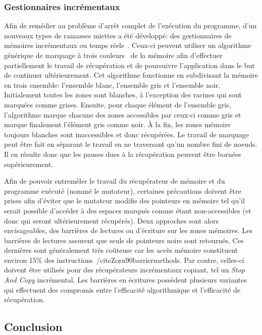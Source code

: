 \documentclass[12pt,oneside,letterpaper,francais]{book}
\begin{document}
\subsubsection{Gestionnaires incrémentaux}
Afin de remédier au problème d'arrêt complet de l'exécution du
programme, d'un nouveaux types de ramasses miettes a été développé:
des gestionnaires de mémoires incrémentaux ou temps
réels~\cite{INCR_BAKER}. Ceux-ci peuvent utiliser un algorithme
générique de marquage à trois couleurs~\cite{dijkstra-tricolour} de la
mémoire afin d'effectuer partiellement le travail de récupération et
de poursuivre l'application dans le but de continuer
ultérieurement. Cet algorithme fonctionne en subdivisant la mémoire en
trois ensemble: l'ensemble blanc, l'ensemble gris et l'ensemble
noir. Initialement toutes les zones sont blanches, à l'exception des
racines qui sont marquées comme grises. Ensuite, pour chaque élément
de l'ensemble gris, l'algorithme marque chacune des zones accessibles
par ceux-ci comme gris et marque finalement l'élément gris comme
noir. À la fin, les zones mémoire toujours blanches sont inaccessibles
et donc récupérées.  Le travail de marquage peut être fait en séparant
le travail en ne traversant qu'un nombre fini de noeuds. Il en résulte
donc que les pauses dues à la récupération peuvent être bornées
supérieurement.

Afin de pouvoir entremêler le travail du récupérateur de mémoire et du
programme exécuté (nommé le mutateur), certaines précautions doivent
être prises afin d'éviter que le mutateur modifie des pointeurs en
mémoire tel qu'il serait possible d'accéder à des espaces marqués
comme étant non-accessibles (et donc qui seront ultérieurement
récupérés). Deux approches sont alors envisageables, des barrières de
lectures ou d'écriture sur les zones mémoires. Les barrières de
lectures assurent que seuls de pointeurs noirs sont retournés. Ces
dernières sont généralement très coûteuse car les accès mémoire
constituent environ 15\% des
instructions~/cite{Zorn90barriermethods}. Par contre, celles-ci
doivent être utilisés pour des récupérateurs incrémentaux copiant, tel
un \textit{Stop And Copy} incrémental. Les barrières en écritures
possèdent plusieurs variantes qui effectuent des compromis entre
l'efficacité algorithmique et l'efficacité de récupération. 


\subsection{Conclusion}
\end{document}
